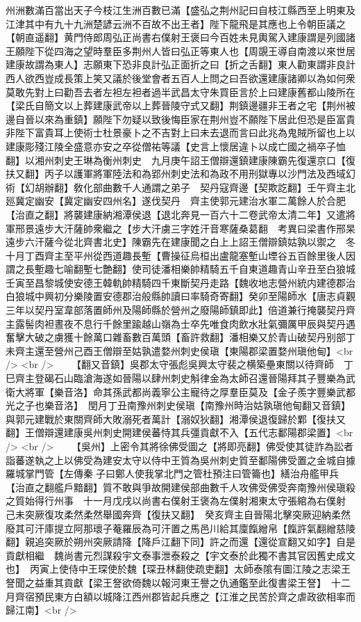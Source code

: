 州洲數滿百當出天子今枝江生洲百數已滿【盛弘之荆州記曰自枝江縣西至上明東及江津其中有九十九洲楚諺云洲不百故不出王者】陛下龍飛是其應也上令朝臣議之【朝直遥翻】黄門侍郎周弘正尚書右僕射王褒曰今百姓未見輿駕入建康謂是列國諸王願陛下從四海之望時羣臣多荆州人皆曰弘正等東人也【周覬王導自南渡以來世居建康故謂為東人】志願東下恐非良計弘正面折之曰【折之舌翻】東人勸東謂非良計西人欲西豈成長策上笑又議於後堂會者五百人上問之曰吾欲還建康諸卿以為如何衆莫敢先對上曰勸吾去者左袒左袒者過半武昌太守朱買臣言於上曰建康舊都山陵所在【梁氏自簡文以上葬建康武帝以上葬晉陵守式又翻】荆鎮邊疆非王者之宅【荆州被邊自晉以來為重鎮】願陛下勿疑以致後悔臣家在荆州豈不願陛下居此但恐是臣富貴非陛下富貴耳上使術士杜景豪卜之不吉對上曰未去退而言曰此兆為鬼賊所留也上以建康彫殘江陵全盛意亦安之卒從僧祐等議【史言上懷居違卜以成亡國之禍卒子恤翻】以湘州刺史王琳為衡州刺史　九月庚午詔王僧辯還鎮建康陳霸先復還京口【復扶又翻】丙子以護軍將軍陸法和為郢州刺史法和為政不用刑獄專以沙門法及西域幻術【幻胡辦翻】敎化部曲數千人通謂之弟子　契丹寇齊邊【契欺訖翻】壬午齊主北廵冀定幽安【冀定幽安四州名】遂伐契丹　齊主使郭元建治水軍二萬餘人於合肥【治直之翻】將襲建康納湘潭侯退【退北奔見一百六十二卷武帝太清二年】又遣將軍邢景遠步大汗薩帥衆繼之【步大汗虜三字姓汗音寒薩桑葛翻　考異曰梁書作邢杲遠步六汗薩今從北齊書北史】陳霸先在建康聞之白上上詔王僧辯鎮姑孰以禦之　冬十月丁酉齊主至平州從西道趣長塹【曹操征烏桓出盧龍塞塹山堙谷五百餘里後人因謂之長塹趣七喻翻塹七艶翻】使司徒潘相樂帥精騎五千自東道趣青山辛丑至白狼城壬寅至昌黎城使安德王韓軌帥精騎四千東斷契丹走路【魏收地志營州統内建德郡治白狼城中興初分樂陵置安德郡治般縣帥讀曰率騎奇寄翻】癸卯至陽師水【唐志貞觀三年以契丹室韋部落置師州及陽師縣於營州之廢陽師鎮即此】倍道兼行掩襲契丹齊主露髻肉袒晝夜不息行千餘里踰越山嶺為士卒先唯食肉飲水壯氣彌厲甲辰與契丹遇奮擊大破之虜獲十餘萬口雜畜數百萬頭【畜許救翻】潘相樂又於青山破契丹别部丁未齊主還至營州己酉王僧辯至姑孰遣婺州刺史侯瑱【東陽郡梁置婺州瑱他甸】<br />
<br />
　　【翻又音鎮】吳郡太守張彪吳興太守裴之横築壘東關以待齊師　丁巳齊主登碣石山臨滄海遂如晉陽以肆州刺史斛律金為太師召還晉陽拜其子豐樂為武衛大將軍【樂音洛】命其孫武都尚義寧公主寵待之厚羣臣莫及【金子羨字豐樂武都光之子也樂音洛】　閏月丁丑南豫州刺史侯瑱【南豫州時治姑孰瑱他甸翻又音鎮】與郭元建戰於東關齊師大敗溺死者萬計【溺奴狄翻】湘潭侯退復歸於鄴【復扶又翻】王僧辯還建康吳州刺史開建侯蕃恃其兵彊貢獻不入【五代志鄱陽郡梁置】<br />
<br />
　　【吳州】上密令其將徐佛受圖之【將即亮翻】佛受使其徒詐為訟者詣蕃遂執之上以佛受為建安太守以侍中王質為吳州刺史質至鄱陽佛受置之金城自據羅城掌門管【左傳秦子曰鄭人使我掌北門之管杜預注曰管籥也】繕治舟艦甲兵【治直之翻艦戶黯翻】質不敢與爭故開建侯部曲數千人攻佛受佛受奔南豫州侯瑱殺之質始得行州事　十一月戊戌以尚書右僕射王褒為左僕射湘東太守張綰為右僕射　己未突厥復攻柔然柔然舉國奔齊【復扶又翻】　癸亥齊主自晉陽北擊突厥迎納柔然廢其可汗庫提立阿那瓌子菴羅辰為可汗置之馬邑川給其廩餼繒帛【餼許氣翻繒慈陵翻】親追突厥於朔州突厥請降【降戶江翻下同】許之而還【還從宣翻又如字】自是貢獻相繼　魏尚書元烈謀殺宇文泰事泄泰殺之【宇文泰於此獨不書其官因舊史成文也】　丙寅上使侍中王琛使於魏【琛丑林翻使疏吏翻】太師泰隂有圖江陵之志梁王詧聞之益重其貢獻【梁王詧欲倚魏以報河東王譽之仇通鑑至此復書梁王詧】　十二月齊宿預民東方白額以城降江西州郡皆起兵應之【江淮之民苦於齊之虐政欲相率而歸江南】<br />
